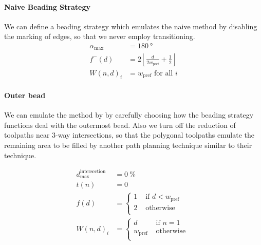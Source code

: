 \paragraph{Naive Beading Strategy}
We can define a beading strategy which emulates the naive method by disabling the marking of edges, so that we never employ transitioning.
\begin{align*}
\alpha_\text{max} &= \SI{180}{\degree} \\
f^-(d) &= 2 \left\lfloor \frac{d}{ 2w_\text{pref}} + \frac12 \right\rfloor \\
W(n,d)_i &= w_\text{pref} \text{ for all } i 
\end{align*}



\paragraph{Outer bead}
We can emulate the method by \citeauthor{Moesen2011} by carefully choosing how the beading strategy functions deal with the outermost bead.
Also we turn off the reduction of toolpaths near 3-way intersections, so that the polygonal toolpaths emulate the remaining area to be filled by another path planning technique similar to their technique.

\begin{align*}
d_\text{max}^\text{intersection} &= \SI{0}{\percent} \\
t(n) &= 0 \\
f(d) &=
\begin{cases}
1 & \text{ if } d < w_\text{pref} \\
2 & \text{ otherwise } \\
\end{cases}
 \\
W(n,d)_i &= 
\begin{cases}
d & \text{ if } n = 1 \\
w_\text{pref} & \text{ otherwise } \\
\end{cases}
\end{align*}


